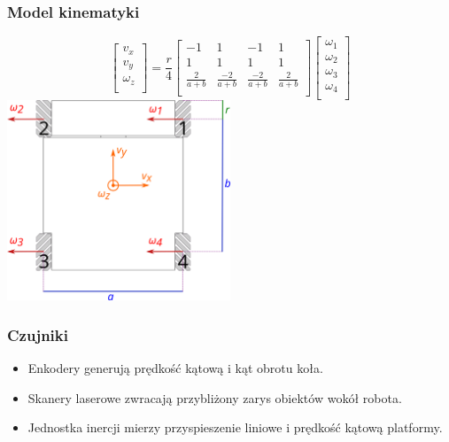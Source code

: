 \documentclass{beamer}
\begin{document}
	\begin{frame}
		\frametitle{Model kinematyki}
		\[
		\begin{bmatrix}
		v_x \\
		v_y \\
		\omega_z \\
		\end{bmatrix}
		=
		\frac{r}{4}
		\begin{bmatrix}
		-1 & 1 & -1 & 1 \\
		1 & 1 & 1 & 1 \\
		\frac{2}{a+b} & \frac{-2}{a+b} & \frac{-2}{a+b} & \frac{2}{a+b} \\
		\end{bmatrix}
		\begin{bmatrix}
		\omega_1 \\
		\omega_2 \\
		\omega_3 \\
		\omega_4 \\
		\end{bmatrix}
		\]
		\centering
		\includegraphics[width=0.5\textwidth]{graphics/base_dims.pdf} 
	\end{frame}

	\begin{frame}
		\frametitle{Czujniki}
		\begin{itemize}
			\item Enkodery generują prędkość kątową i kąt obrotu koła.
			\item Skanery laserowe zwracają przybliżony zarys obiektów wokół robota.
			\item Jednostka inercji mierzy przyspieszenie liniowe i prędkość kątową platformy.
		\end{itemize}
	\end{frame}
	
	
	
\end{document}
